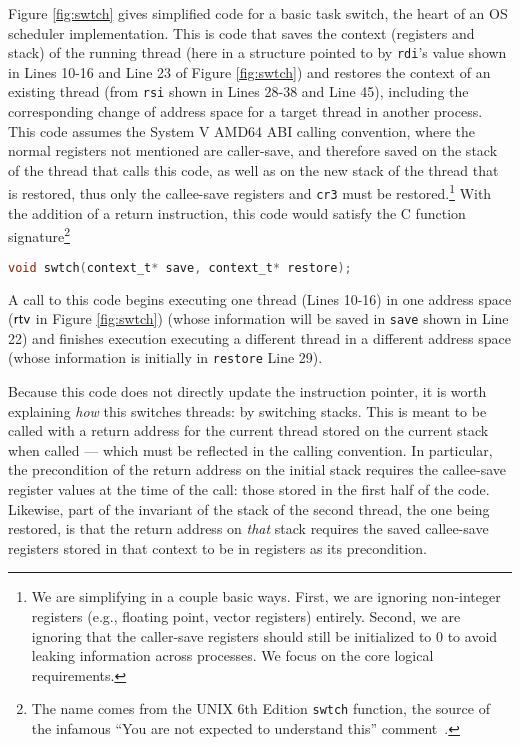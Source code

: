 Figure \ref{fig:swtch} gives simplified code for a basic task switch, the heart of an OS scheduler implementation. This is code that saves the context (registers and stack) of the running thread (here in a structure pointed to by \lstinline|rdi|'s value shown in Lines 10-16 and Line 23 of Figure \ref{fig:swtch}) and restores the context of an existing thread (from \lstinline|rsi| shown in Lines 28-38 and Line 45), including the corresponding change of address space for a target thread in another process.
This code assumes the System V AMD64 ABI calling convention, where the normal registers not mentioned are caller-save, and therefore saved on the stack of the thread that calls this code, as well as on the new stack of the thread that is restored, thus only the callee-save registers and \texttt{cr3} must be restored.\footnote{We are simplifying in a couple basic ways. First, we are ignoring non-integer registers (e.g., floating point, vector registers) entirely. Second, we are ignoring that the caller-save registers should still be initialized to 0 to avoid leaking information across processes. We focus on the core logical requirements.}
With the addition of a return instruction, this code would satisfy the C function signature\footnote{The name comes from the UNIX 6th Edition \lstinline|swtch| function, the source of the infamous ``You are not expected to understand this'' comment~\cite{lions1996lions}.}
\begin{lstlisting}[language=C]
void swtch(context_t* save, context_t* restore);
\end{lstlisting}
A call to this code begins executing one thread (Lines 10-16) in one address space ($\textsf{rtv}$ in Figure \ref{fig:swtch}) (whose information will be saved in \lstinline[language=C]|save| shown in Line 22) and finishes execution executing a different thread in a different address space (whose information is initially in \lstinline[language=C]|restore| Line 29).

Because this code does not directly update the instruction pointer, it is worth explaining \emph{how} this switches threads: by switching stacks. This is meant to be called with a return address for the current thread stored on the current stack when called --- which must be reflected in the calling convention. In particular, the precondition of the return address on the initial stack requires the callee-save register values at the time of the call: those stored in the first half of the code.
Likewise, part of the invariant of the stack of the second thread, the one being restored, is that the return address on \emph{that} stack requires the saved callee-save registers stored in that context to be in registers as its precondition.


